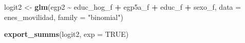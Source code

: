 \documentclass[
]{article}
\newenvironment{Shaded}{\begin{snugshade}}{\end{snugshade}}
\newcommand{\AttributeTok}[1]{\textcolor[rgb]{0.13,0.29,0.53}{#1}}
\newcommand{\ConstantTok}[1]{\textcolor[rgb]{0.56,0.35,0.01}{#1}}
\newcommand{\FunctionTok}[1]{\textcolor[rgb]{0.13,0.29,0.53}{\textbf{#1}}}
\newcommand{\NormalTok}[1]{#1}
\newcommand{\OtherTok}[1]{\textcolor[rgb]{0.56,0.35,0.01}{#1}}
\newcommand{\SpecialCharTok}[1]{\textcolor[rgb]{0.81,0.36,0.00}{\textbf{#1}}}
\newcommand{\StringTok}[1]{\textcolor[rgb]{0.31,0.60,0.02}{#1}}
\begin{document}
\begin{Shaded}
\begin{Highlighting}[]
\NormalTok{logit2 }\OtherTok{\textless{}{-}} \FunctionTok{glm}\NormalTok{(egp2 }\SpecialCharTok{\textasciitilde{}}\NormalTok{ educ\_hog\_f }\SpecialCharTok{+}\NormalTok{ egp5a\_f }\SpecialCharTok{+}\NormalTok{ educ\_f }\SpecialCharTok{+}\NormalTok{ sexo\_f, }\AttributeTok{data =}\NormalTok{ enes\_movilidad,}
    \AttributeTok{family =} \StringTok{"binomial"}\NormalTok{)}

\FunctionTok{export\_summs}\NormalTok{(logit2, }\AttributeTok{exp =} \ConstantTok{TRUE}\NormalTok{)}
\end{Highlighting}
\end{Shaded}

 
  \providecommand{\huxb}[2]{\arrayrulecolor[RGB]{#1}\global\arrayrulewidth=#2pt}
  \providecommand{\huxvb}[2]{\color[RGB]{#1}\vrule width #2pt}
  \providecommand{\huxtpad}[1]{\rule{0pt}{#1}}
  \providecommand{\huxbpad}[1]{\rule[-#1]{0pt}{#1}}
\end{document}
